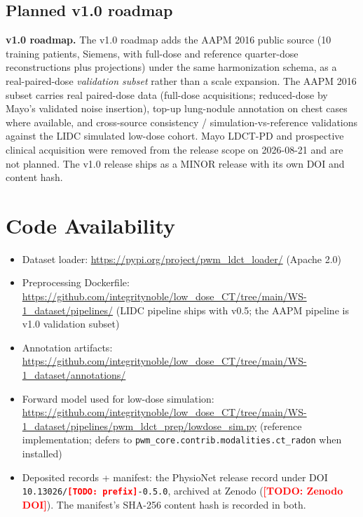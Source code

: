 \documentclass[twoside,11pt]{article}
\newcommand{\todo}[1]{\textcolor{red}{\textbf{[TODO: #1]}}}
\begin{document}
\subsection*{Planned v1.0 roadmap}

\textbf{v1.0 roadmap.} The v1.0 roadmap adds the AAPM 2016 public source (10 training patients, Siemens, with full-dose and reference quarter-dose reconstructions plus projections) under the same harmonization schema, as a real-paired-dose \emph{validation subset} rather than a scale expansion. The AAPM 2016 subset carries real paired-dose data (full-dose acquisitions; reduced-dose by Mayo's validated noise insertion), top-up lung-nodule annotation on chest cases where available, and cross-source consistency / simulation-vs-reference validations against the LIDC simulated low-dose cohort. Mayo LDCT-PD and prospective clinical acquisition were removed from the release scope on 2026-08-21 and are not planned. The v1.0 release ships as a MINOR release with its own DOI and content hash.

\section*{Code Availability}

\begin{itemize}
    \item Dataset loader: \url{https://pypi.org/project/pwm_ldct_loader/} (Apache 2.0)
    \item Preprocessing Dockerfile: \url{https://github.com/integritynoble/low_dose_CT/tree/main/WS-1_dataset/pipelines/} (LIDC pipeline ships with v0.5; the AAPM pipeline is v1.0 validation subset)
    \item Annotation artifacts: \url{https://github.com/integritynoble/low_dose_CT/tree/main/WS-1_dataset/annotations/}
    \item Forward model used for low-dose simulation: \url{https://github.com/integritynoble/low_dose_CT/tree/main/WS-1_dataset/pipelines/pwm_ldct_prep/lowdose_sim.py} (reference implementation; defers to \texttt{pwm\_core.contrib.modalities.ct\_radon} when installed)
    \item Deposited records + manifest: the PhysioNet release record under DOI \texttt{10.13026/\todo{prefix}-0.5.0}, archived at Zenodo (\todo{Zenodo DOI}). The manifest's SHA-256 content hash is recorded in both.
\end{itemize}
\end{document}
